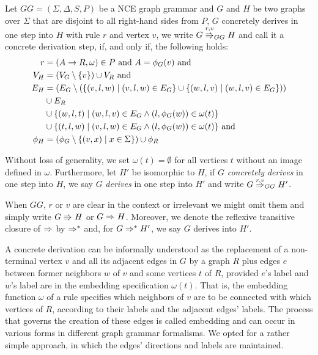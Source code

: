 \documentclass[runningheads]{llncs}
\begin{document}
\begin{definition}
	\label{def:gg_dstep}
	Let $GG = (\Sigma, \Delta, S, P)$ be a NCE graph grammar and $G$ and $H$ be two graphs over $\Sigma$ that are disjoint to all right-hand sides from $P$, $G$ concretely derives in one step into $H$ with rule $r$ and vertex $v$, we write $G \cderiv{r}{v}{GG} H$ and call it a concrete derivation step, if, and only if, the following holds:
	\begin{align*}
		r & = (A \to R, \omega) \in P \text{ and } A = \phi_G(v) \text{ and} \\
		V_H  & = (V_G \setminus \{v\}) \cup V_R \text{ and} \\
		E_H & = (E_G \setminus (\{(v,l,w) \; | \; (v,l,w) \in E_G\} \cup \{(w,l,v) \; | \; (w,l,v) \in E_G\})) \\
		& \cup E_R \\
		& \cup \{(w,l,t) \; | \; (w,l,v) \in E_G \land (l,\phi_G(w)) \in \omega(t)\} \\
		& \cup \{(t,l,w) \; | \; (v,l,w) \in E_G \land (l,\phi_G(w)) \in \omega(t)\} \text{ and} \\
		\phi_H & = (\phi_G \setminus \{(v,x) \; | \; x \in \Sigma \}) \cup \phi_R
	\end{align*}
\end{definition}

Without loss of generality, we set $\omega(t) = \emptyset$ for all vertices $t$ without an image defined in $\omega$. Furthermore, let $H'$ be isomorphic to $H$, if $G$ \textit{concretely derives} in one step into $H$, we say $G$ \textit{derives} in one step into $H'$ and write $G \deriv{r}{v}{GG} H'$. 
	
When $GG$, $r$ or $v$ are clear in the context or irrelevant we might omit them and simply write $G \cderiv{}{}{} H$ or $G \deriv{}{}{} H$. Moreover, we denote the reflexive transitive closure of $\deriv{}{}{}$ by $\Rightarrow^*_{}$ and, for $G \Rightarrow^*_{} H'$, we say $G$ derives into $H'$.

A concrete derivation can be informally understood as the replacement of a non-terminal vertex $v$ and all its adjacent edges in $G$ by a graph $R$ plus edges $e$ between former neighbors $w$ of $v$ and some vertices $t$ of $R$, provided $e$'s label and $w$'s label are in the embedding specification $\omega(t)$. That is, the embedding function $\omega$ of a rule specifies which neighbors of $v$ are to be connected with which vertices of $R$, according to their labels and the adjacent edges' labels. The process that governs the creation of these edges is called embedding and can occur in various forms in different graph grammar formalisms. We opted for a rather simple approach, in which the edges' directions and labels are maintained.
\end{document}

